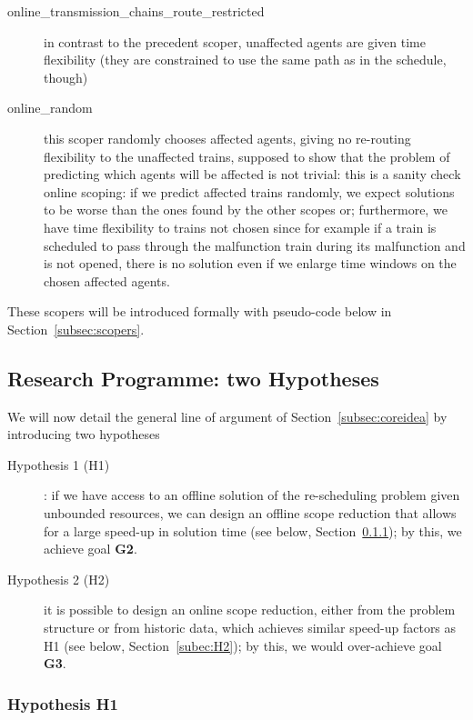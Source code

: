 \documentclass{article}
\begin{document}
\begin{description}
\item[online\_transmission\_chains\_route\_restricted] in contrast to the precedent scoper, unaffected agents are given time flexibility (they are constrained to use the same path as in the schedule, though)
\item[online\_random] this scoper randomly chooses affected agents, giving no re-routing flexibility to the unaffected trains, supposed to show that the problem of predicting which agents will be affected is not trivial: this is a sanity check online scoping: if we predict affected trains randomly, we expect solutions to be worse than the ones found by the other scopes or; furthermore, we have time flexibility to trains not chosen since for example if a train is scheduled to pass through the malfunction train during its malfunction and is not opened, there is no solution even if we enlarge time windows on the chosen affected agents.
\end{description}

These scopers will be introduced formally with pseudo-code below in Section~\ref{subsec:scopers}.


\subsection{Research Programme: two Hypotheses }\label{subec:hypotheses}
We will now detail the general line of argument of Section~\ref{subsec:coreidea} by introducing two hypotheses
\begin{description}
\item [Hypothesis 1 (H1)] : if we have access to an offline solution of the re-scheduling problem given unbounded resources, we can design an offline scope reduction that allows for a large speed-up in solution time (see below, Section~\ref{subec:H1}); by this, we achieve goal \textbf{G2}.
\item [Hypothesis 2 (H2)] it is possible to design an online scope reduction, either from the problem structure or from historic data, which achieves similar speed-up factors as H1 (see below, Section~\ref{subec:H2}); by this, we would over-achieve goal \textbf{G3}.
\end{description}

\subsubsection{Hypothesis H1}\label{subec:H1}
\end{document}
